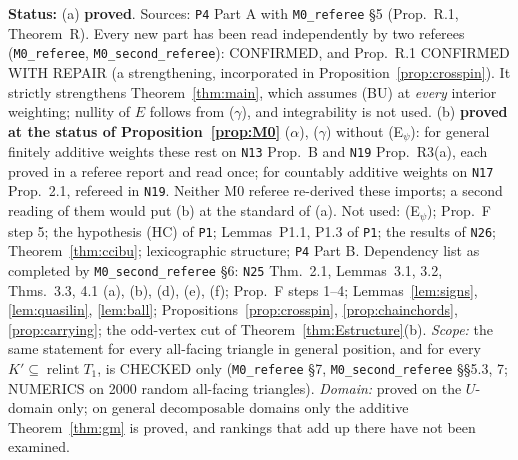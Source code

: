 \documentclass[11pt]{article}
\theoremstyle{definition}
\theoremstyle{remark}
\newcommand{\relint}{\operatorname{relint}}
\newcommand{\src}[1]{\texttt{#1}}
\newcommand{\status}[1]{\par\smallskip\noindent\textbf{Status:} #1\par\smallskip}
\begin{document}
\status{(a) \textbf{proved}. Sources: \src{P4} Part A with \src{M0\_referee} \S5 (Prop.~R.1, Theorem~R). Every new part has been read independently by two referees (\src{M0\_referee}, \src{M0\_second\_referee}): CONFIRMED, and Prop.~R.1 CONFIRMED WITH REPAIR (a strengthening, incorporated in Proposition~\ref{prop:crosspin}). It strictly strengthens Theorem~\ref{thm:main}, which assumes (BU) at \emph{every} interior weighting; nullity of $E$ follows from ($\gamma$), and integrability is not used. (b) \textbf{proved at the status of Proposition~\ref{prop:M0}} ($\alpha$), ($\gamma$) without (E$_\psi$): for general finitely additive weights these rest on \src{N13} Prop.~B and \src{N19} Prop.~R3(a), each proved in a referee report and read once; for countably additive weights on \src{N17} Prop.~2.1, refereed in \src{N19}. Neither M0 referee re-derived these imports; a second reading of them would put (b) at the standard of (a). Not used: (E$_\psi$); Prop.~F step 5; the hypothesis (HC) of \src{P1}; Lemmas~P1.1, P1.3 of \src{P1}; the results of \src{N26}; Theorem~\ref{thm:ccibu}; lexicographic structure; \src{P4} Part B. Dependency list as completed by \src{M0\_second\_referee} \S6: \src{N25} Thm.~2.1, Lemmas~3.1, 3.2, Thms.~3.3, 4.1 (a), (b), (d), (e), (f); Prop.~F steps 1--4; Lemmas~\ref{lem:signs}, \ref{lem:quasilin}, \ref{lem:ball}; Propositions~\ref{prop:crosspin}, \ref{prop:chainchords}, \ref{prop:carrying}; the odd-vertex cut of Theorem~\ref{thm:Estructure}(b). \emph{Scope:} the same statement for every all-facing triangle in general position, and for every $K'\subseteq\relint T_1$, is CHECKED only (\src{M0\_referee} \S7, \src{M0\_second\_referee} \S\S5.3, 7; NUMERICS on 2000 random all-facing triangles). \emph{Domain:} proved on the $U$-domain only; on general decomposable domains only the additive Theorem~\ref{thm:gm} is proved, and rankings that add up there have not been examined.}
\end{document}
